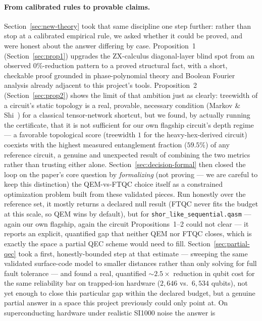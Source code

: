 \documentclass[9pt,twocolumn]{extarticle}
\begin{document}
\paragraph{From calibrated rules to provable claims.} Section~\ref{sec:new-theory}
took that same discipline one step further: rather than stop at a
calibrated empirical rule, we asked whether it could be proved, and were
honest about the answer differing by case. Proposition~1
(Section~\ref{sec:prop1}) upgrades the ZX-calculus diagonal-layer blind
spot from an observed $0\%$-reduction pattern to a proved structural fact,
with a short, checkable proof grounded in phase-polynomial theory and
Boolean Fourier analysis already adjacent to this project's tools.
Proposition~2 (Section~\ref{sec:prop2}) shows the limit of that ambition
just as clearly: treewidth of a circuit's static topology is a real,
provable, necessary condition (Markov \& Shi~\cite{markovshi2008}) for a
classical tensor-network shortcut, but we found, by actually running the
certificate, that it is not sufficient for our own flagship circuit's
depth regime --- a favorable topological score (treewidth $1$ for the
heavy-hex-derived circuit) coexists with the highest measured entanglement
fraction ($59.5\%$) of any reference circuit, a genuine and unexpected
result of combining the two metrics rather than trusting either alone.
Section~\ref{sec:decision-formal} then closed the loop on the paper's
core question by \emph{formalizing} (not proving --- we are careful to
keep this distinction) the QEM-vs-FTQC choice itself as a constrained
optimization problem built from these validated pieces. Run honestly over
the reference set, it mostly returns a declared null result (FTQC never
fits the budget at this scale, so QEM wins by default), but for
\texttt{shor\_like\_sequential.qasm} --- again our own flagship, again the
circuit Propositions~1--2 could not clear --- it reports an explicit,
quantified gap that neither QEM nor FTQC closes, which is exactly the
space a partial QEC scheme would need to fill. Section~\ref{sec:partial-qec}
took a first, honestly-bounded step at that estimate --- sweeping the
same validated surface-code model to smaller distances rather than only
solving for full fault tolerance --- and found a real, quantified
$\sim\!2.5\times$ reduction in qubit cost for the same reliability bar on
trapped-ion hardware ($2{,}646$ vs.\ $6{,}534$ qubits), not yet enough to
close this particular gap within the declared budget, but a genuine partial
answer in a space this project previously could only point at. On
superconducting hardware under realistic SI1000 noise the answer is
\end{document}
